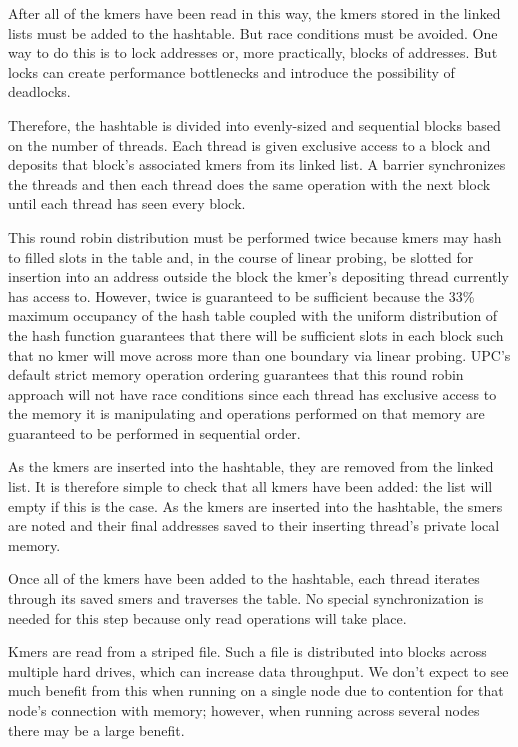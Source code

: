 \documentclass{article}
\begin{document}
After all of the kmers have been read in this way, the kmers stored in the linked lists must be added to the hashtable. But race conditions must be avoided. One way to do this is to lock addresses or, more practically, blocks of addresses. But locks can create performance bottlenecks and introduce the possibility of deadlocks.

Therefore, the hashtable is divided into evenly-sized and sequential blocks based on the number of threads. Each thread is given exclusive access to a block and deposits that block's associated kmers from its linked list. A barrier synchronizes the threads and then each thread does the same operation with the next block until each thread has seen every block.

This round robin distribution must be performed twice because kmers may hash to filled slots in the table and, in the course of linear probing, be slotted for insertion into an address outside the block the kmer's depositing thread currently has access to. However, twice is guaranteed to be sufficient because the 33\% maximum occupancy of the hash table coupled with the uniform distribution of the hash function guarantees that there will be sufficient slots in each block such that no kmer will move across more than one boundary via linear probing. UPC's default strict memory operation ordering guarantees that this round robin approach will not have race conditions since each thread has exclusive access to the memory it is manipulating and operations performed on that memory are guaranteed to be performed in sequential order.

As the kmers are inserted into the hashtable, they are removed from the linked list. It is therefore simple to check that all kmers have been added: the list will empty if this is the case. As the kmers are inserted into the hashtable, the smers are noted and their final addresses saved to their inserting thread's private local memory.

Once all of the kmers have been added to the hashtable, each thread iterates through its saved smers and traverses the table. No special synchronization is needed for this step because only read operations will take place.

Kmers are read from a striped file. Such a file is distributed into blocks across multiple hard drives, which can increase data throughput. We don't expect to see much benefit from this when running on a single node due to contention for that node's connection with memory; however, when running across several nodes there may be a large benefit.
\end{document}
